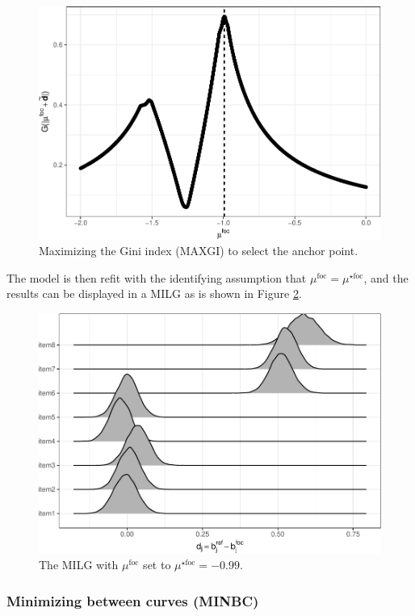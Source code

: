 \documentclass[
  11pt,
]{article}
\begin{document}
\begin{figure}[H]

{\centering \includegraphics[width=0.7\linewidth]{paper_files/figure-latex/ginipath-1} 

}

\caption{Maximizing the Gini index (MAXGI) to select the anchor point.}\label{fig:ginipath}
\end{figure}

The model is then refit with the identifying assumption that \(\mu^{\text{foc}} = \mu^{\star\text{foc}}\), and the results can be displayed in a MILG as is shown in Figure \ref{fig:ginimilg}.

\begin{figure}[H]

{\centering \includegraphics[width=0.7\linewidth]{paper_files/figure-latex/ginimilg-1} 

}

\caption{The MILG with $\mu^{\text{foc}}$ set to $\mu^{\star\text{foc}} = -0.99$.}\label{fig:ginimilg}
\end{figure}

\hypertarget{minimizing-between-curves-minbc}{%
\subsubsection{Minimizing between curves (MINBC)}\label{minimizing-between-curves-minbc}}
\end{document}
